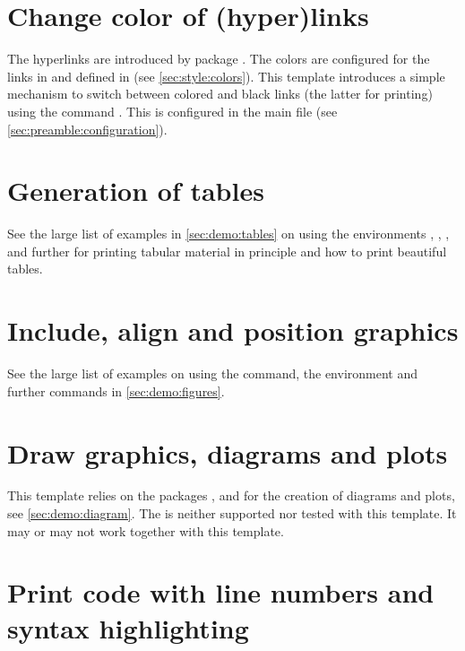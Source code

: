 \section{Change color of (hyper)links}
\label{sec:doc:faq:hyperlinks}
The hyperlinks are introduced by package . The colors are configured for the links in  and defined in  (see \cref{sec:style:colors}). This template introduces a simple mechanism to switch between colored and black links (the latter for printing) using the command . This is configured in the main file (see \cref{sec:preamble:configuration}).

\section{Generation of tables}
\label{sec:doc:faq:tables}
See the large list of examples in \cref{sec:demo:tables} on using the environments , , ,  and further for printing tabular material in principle and how to print beautiful tables.

\section{Include, align and position graphics}
\label{sec:doc:faq:graphics}
See the large list of examples on using the  command, the  environment and further commands in \cref{sec:demo:figures}.

\section{Draw graphics, diagrams and plots}
\label{sec:doc:faq:pgf}

This template relies on the packages ,  and  for the creation of diagrams and plots, see \cref{sec:demo:diagram}. The  is neither supported nor tested with this template. It may or may not work together with this template.

\section{Print code with line numbers and syntax highlighting}
\label{sec:doc:faq:listings}

